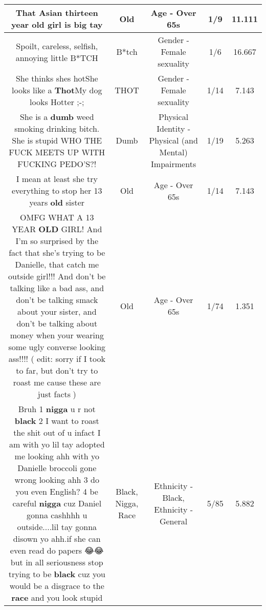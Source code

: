 \documentclass[11pt]{article}
\newlength\mylength
\begin{document}
\begin{center}
\begin{longtable}{|C{.65\mylength}|C{.30\mylength}|C{.12\mylength}|C{.12\mylength}|C{.12\mylength}|}
  \small That Asian thirteen year \textbf{old} girl is big tay\normalsize   & Old & Age - Over 65s & 1/9 & 11.111 \\  \hline
  \small Spoilt, careless, selfish, annoying little B*TCH\normalsize   & B*tch & Gender - Female sexuality & 1/6 & 16.667 \\  \hline
  \small She thinks shes hotShe looks like a \textbf{Thot}My dog looks Hotter ;-;\normalsize   & THOT & Gender - Female sexuality & 1/14 & 7.143 \\  \hline
  \small She is a \textbf{dumb} weed smoking drinking bitch. She is stupid WHO THE FUCK MEETS UP WITH FUCKING PEDO'S?!\normalsize   & Dumb & Physical Identity - Physical (and Mental) Impairments & 1/19 & 5.263 \\  \hline
  \small I mean at least she try everything to stop her 13 years \textbf{old} sister\normalsize   & Old & Age - Over 65s & 1/14 & 7.143 \\  \hline
  \small OMFG WHAT A 13 YEAR \textbf{OLD} GIRL! And I'm so surprised by the fact that she's trying to be Danielle, that catch me outside girl!!! And don't be talking like a bad ass, and don't be talking smack about your sister, and don't be talking about money when your wearing some ugly converse looking ass!!!! ( edit: sorry if I took to far, but don't try to roast me cause these are just facts🤗)\normalsize   & Old & Age - Over 65s & 1/74 & 1.351 \\  \hline
  \small Bruh 1 \textbf{nigga} u r not \textbf{black} 2 I want to roast the shit out of u infact I am with yo lil tay adopted me looking ahh with yo Danielle broccoli gone wrong looking ahh 3 do you even English? 4 be careful \textbf{nigga} cuz Daniel gonna cashhhh u outside....lil tay gonna disown yo ahh.if she can even read do papers 😂😂 but in all seriousness stop trying to be \textbf{black} cuz you would be a disgrace to the \textbf{race} and you look stupid\normalsize   & Black, Nigga, Race & Ethnicity - Black, Ethnicity - General & 5/85 & 5.882 \\  \hline

\end{longtable}
\end{center}
\end{document}
